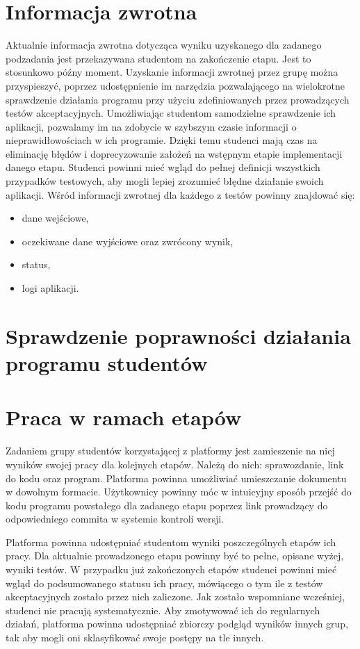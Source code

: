 \section{Informacja zwrotna}

Aktualnie informacja zwrotna dotycząca wyniku uzyskanego dla zadanego podzadania jest przekazywana studentom na zakończenie etapu.
Jest to stosunkowo późny moment.
Uzyskanie informacji zwrotnej przez grupę można przyspieszyć, poprzez udostępnienie im narzędzia pozwalającego na wielokrotne sprawdzenie działania programu przy użyciu zdefiniowanych przez prowadzących testów akceptacyjnych.
Umożliwiając studentom samodzielne sprawdzenie ich aplikacji, pozwalamy im na zdobycie w szybszym czasie informacji o nieprawidłowościach w ich programie.
Dzięki temu studenci mają czas na eliminację błędów i doprecyzowanie założeń na wstępnym etapie implementacji danego etapu.
Studenci powinni mieć wgląd do pełnej definicji wszystkich przypadków testowych, aby mogli lepiej zrozumieć błędne działanie swoich aplikacji.
Wśród informacji zwrotnej dla każdego z testów powinny znajdować się:
\begin{itemize}
    \item dane wejściowe,
    \item oczekiwane dane wyjściowe oraz zwrócony wynik,
    \item status,
    \item logi aplikacji.
\end{itemize}

\section{Sprawdzenie poprawności działania programu studentów}

\section{Praca w ramach etapów}

Zadaniem grupy studentów korzystającej z platformy jest zamieszenie na niej wyników swojej pracy dla kolejnych etapów.
Należą do nich: sprawozdanie, link do kodu oraz program.
Platforma powinna umożliwiać umieszczanie dokumentu w dowolnym formacie.
Użytkownicy powinny móc w intuicyjny sposób przejść do kodu programu powstałego dla zadanego etapu poprzez link prowadzący do odpowiedniego commita w systemie kontroli wersji.

Platforma powinna udostępniać studentom wyniki poszczególnych etapów ich pracy.
Dla aktualnie prowadzonego etapu powinny być to pełne, opisane wyżej, wyniki testów.
W przypadku już zakończonych etapów studenci powinni mieć wgląd do podsumowanego statusu ich pracy, mówiącego o tym ile z testów akceptacyjnych zostało przez nich zaliczone.
Jak zostało wspomniane wcześniej, studenci nie pracują systematycznie.
Aby zmotywować ich do regularnych działań, platforma powinna udostępniać zbiorczy podgląd wyników innych grup, tak aby mogli oni sklasyfikować swoje postępy na tle innych.

